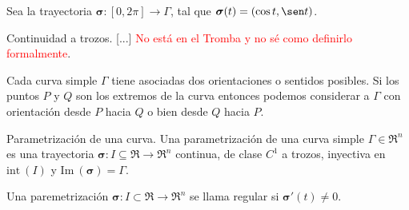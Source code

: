 \begin{example}
    Sea la trayectoria $\boldsymbol{\sigma}:[0,2\pi]\to\Gamma$, tal que $\boldsymbol{\sigma}(t)=(\cos t, \sen t)$.

    \begin{center}
    \end{center}
    
\end{example}

\begin{definition}
    Continuidad a trozos. [...] \textcolor{red}{No est\'a en el Tromba y no s\'e como definirlo formalmente}.\final
\end{definition}

Cada curva simple $\Gamma$ tiene asociadas dos orientaciones o sentidos posibles. Si los puntos $P$ y $Q$ son los extremos de la curva entonces podemos considerar a $\Gamma$ con orientaci\'on desde $P$ hacia $Q$ o bien desde $Q$ hacia $P$.

\begin{definition}
    Parametrizaci\'on de una curva. Una parametrizaci\'on de una curva simple $\Gamma\in\Re^n$ es una trayectoria $\boldsymbol{\sigma}:I\subseteq\Re\to\Re^n$ continua, de clase $C^1$ a trozos, inyectiva en $\text{int}\:(I)$ y $\text{Im}\:(\boldsymbol{\sigma})=\Gamma$.\final
\end{definition}

\begin{definition}
    Una paremetrizaci\'on $\boldsymbol{\sigma}:I\subset\Re\to\Re^n$ se llama regular si $\boldsymbol{\sigma}'(t)\neq0$.\final
\end{definition}